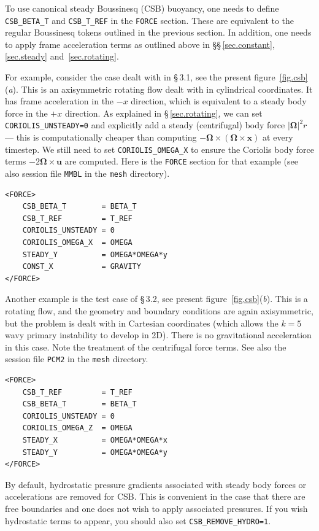 \documentclass[11pt]{report}
\begin{document}
To use canonical steady Boussinesq (CSB) buoyancy, one needs to define
\verb|CSB_BETA_T| and \verb|CSB_T_REF| in the \verb|FORCE| section.
These are equivalent to the regular Boussinesq tokens outlined in the
previous section. In addition, one needs to apply frame acceleration
terms as outlined above in \S\S\,\ref{sec.constant}, \ref{sec.steady}
and~\ref{sec.rotating}.  

For example, consider the case dealt with in \citet{blss21} \S\,3.1,
see the present figure~\ref{fig.csb}(\textit{a}).  This is an
axisymmetric rotating flow dealt with in cylindrical coordinates.  It
has frame acceleration in the $-x$ direction, which is equivalent to a
steady body force in the $+x$ direction.  As explained in
\S\,\ref{sec.rotating}, we can set \verb|CORIOLIS_UNSTEADY=0| and
explicitly add a steady (centrifugal) body force $|\bm{\Omega}|^2r$
--- this is computationally cheaper than computing
$-\bm{\Omega}\times(\bm{\Omega}\times\bm{x})$ at every timestep.  We
still need to set \verb|CORIOLIS_OMEGA_X| to ensure the Coriolis body
force terms $-2\bm{\Omega}\times\bm{u}$ are computed.  Here is the
\verb|FORCE| section for that example (see also session file
\verb|MMBL| in the \verb|mesh| directory).

\begin{verbatim}
<FORCE>
    CSB_BETA_T        = BETA_T
    CSB_T_REF         = T_REF
    CORIOLIS_UNSTEADY = 0
    CORIOLIS_OMEGA_X  = OMEGA
    STEADY_Y          = OMEGA*OMEGA*y
    CONST_X           = GRAVITY
</FORCE>
\end{verbatim}

Another example is the test case of \citet{blss21} \S\,3.2, see
present figure~\ref{fig.csb}(\textit{b}).  This is a rotating flow,
and the geometry and boundary conditions are again axisymmetric, but
the problem is dealt with in Cartesian coordinates (which allows the
$k=5$ wavy primary instability to develop in 2D). There is no
gravitational acceleration in this case.  Note the treatment of the
centrifugal force terms.  See also the session file \verb|PCM2| in the
\verb|mesh| directory.

\begin{verbatim}
<FORCE>
    CSB_T_REF         = T_REF
    CSB_BETA_T        = BETA_T
    CORIOLIS_UNSTEADY = 0
    CORIOLIS_OMEGA_Z  = OMEGA
    STEADY_X          = OMEGA*OMEGA*x
    STEADY_Y          = OMEGA*OMEGA*y
</FORCE>
\end{verbatim}

By default, hydrostatic pressure gradients associated with steady body
forces or accelerations are removed for CSB.  This is convenient in
the case that there are free boundaries and one does not wish to apply
associated pressures.  If you wish hydrostatic terms to appear, you
should also set \verb|CSB_REMOVE_HYDRO=1|.
 
\end{document}
